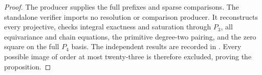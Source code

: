 \begin{proof}
The producer  supplies the full
prefixes and sparse comparisons.  The standalone verifier
 imports no resolution
or comparison producer.  It reconstructs every projective,
checks integral exactness and saturation through $P_3$, all
equivariance and chain equations, the primitive degree-two
pairing, and the zero square on the full $P_4$ basis.  The
independent results are recorded in
.
Every possible image of order at most twenty-three is therefore
excluded, proving the proposition.
\end{proof}
